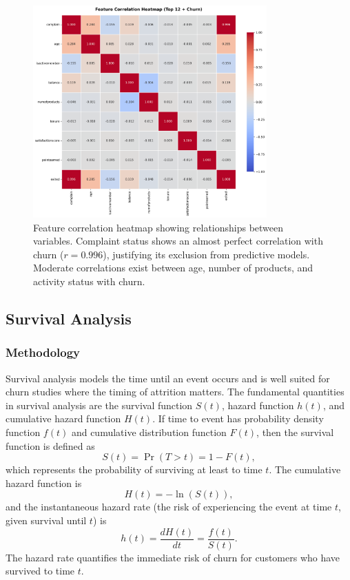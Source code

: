 \documentclass[12pt]{article}
\begin{document}
\begin{figure}[H]
\centering
\includegraphics[width=0.8\textwidth]{img/08_correlation_heatmap.png}
\caption{Feature correlation heatmap showing relationships between variables. Complaint status shows an almost perfect correlation with churn (\(r=0.996\)), justifying its exclusion from predictive models. Moderate correlations exist between age, number of products, and activity status with churn.}
\label{fig:correlation}
\end{figure}

\subsection{Survival Analysis}
\subsubsection{Methodology}
Survival analysis models the time until an event occurs and is well suited for churn studies where the timing of attrition matters.  The fundamental quantities in survival analysis are the survival function \(S(t)\), hazard function \(h(t)\), and cumulative hazard function \(H(t)\).  If time to event has probability density function \(f(t)\) and cumulative distribution function \(F(t)\), then the survival function is defined as
\[ S(t) = \Pr(T > t) = 1 - F(t), \]
which represents the probability of surviving at least to time \(t\).  The cumulative hazard function is
\[ H(t) = -\ln(S(t)), \]
and the instantaneous hazard rate (the risk of experiencing the event at time \(t\), given survival until \(t\)) is
\[ h(t) = \frac{dH(t)}{dt} = \frac{f(t)}{S(t)}. \]
The hazard rate quantifies the immediate risk of churn for customers who have survived to time \(t\).
\end{document}
